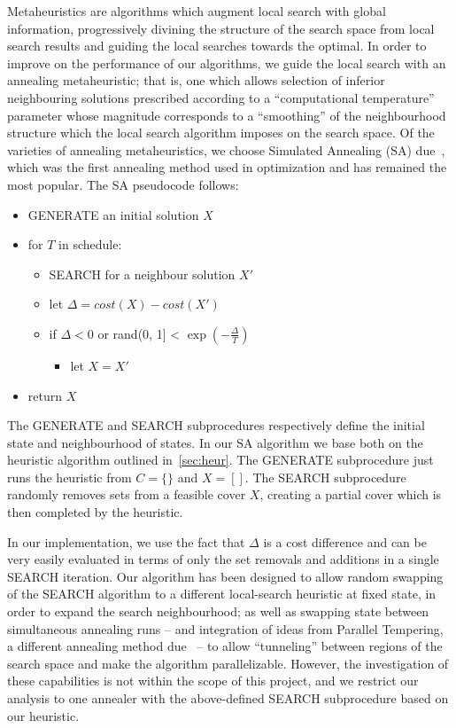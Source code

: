 Metaheuristics are algorithms which augment local search with global information, progressively divining the structure of the search space from local search results and guiding the local searches towards the optimal. In order to improve on the performance of our algorithms, we guide the local search with an annealing metaheuristic; that is, one which allows selection of inferior neighbouring solutions prescribed according to a ``computational temperature'' parameter whose magnitude corresponds to a ``smoothing'' of the neighbourhood structure which the local search algorithm imposes on the search space. Of the varieties of annealing metaheuristics, we choose Simulated Annealing (SA) due~\cite{Kirkpatrick671}, which was the first annealing method used in optimization and has remained the most popular. The SA pseudocode follows:
\begin{itemize}
    \item GENERATE an initial solution $X$
    \item for $T$ in schedule:
    \begin{itemize}
        \item SEARCH for a neighbour solution $X'$
        \item let $\Delta = cost(X) - cost(X')$
        \item if $\Delta < 0$ or rand(0, 1] < $\exp(-\frac{\Delta}{T})$
        \begin{itemize}
            \item let $X = X'$
        \end{itemize}
    \end{itemize}
    \item return $X$
\end{itemize}

The GENERATE and SEARCH subprocedures respectively define the initial state and neighbourhood of states. In our SA algorithm we base both on the heuristic algorithm outlined in~\ref{sec:heur}. The GENERATE subprocedure just runs the heuristic from $C=\{\}$ and $X=[]$. The SEARCH subprocedure randomly removes sets from a feasible cover $X$, creating a partial cover which is then completed by the heuristic.

In our implementation, we use the fact that $\Delta$ is a cost difference and can be very easily evaluated in terms of only the set removals and additions in a single SEARCH iteration. Our algorithm has been designed to allow random swapping of the SEARCH algorithm to a different local-search heuristic at fixed state, in order to expand the search neighbourhood; as well as swapping state between simultaneous annealing runs -- and integration of ideas from Parallel Tempering, a different annealing method due~\cite{Swendsen_Wang_1986} -- to allow ``tunneling'' between regions of the search space and make the algorithm parallelizable. However, the investigation of these capabilities is not within the scope of this project, and we restrict our analysis to one annealer with the above-defined SEARCH subprocedure based on our heuristic.

